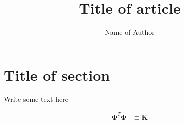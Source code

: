 \documentclass{article}
\title{Title of article}
\author{Name of Author}
\date{}
\begin{document}
\maketitle



\section{Title of section}


Write some text here


\begin{align}
\boldsymbol{\Phi}^{T}\boldsymbol{\Phi}
&\equiv
\mathbf{K}
\end{align}




%
%
\end{document}
